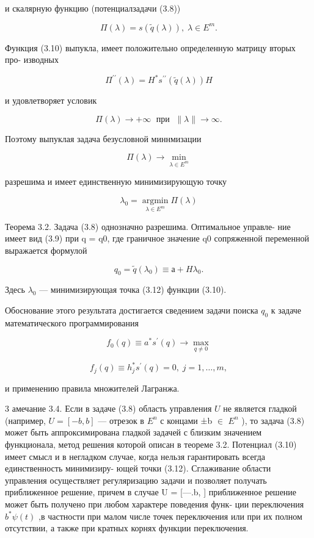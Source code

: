 \documentclass[10pt]{article}
\begin{document}
и скалярную функцию (потенциалзадачи (3.8))

\[
\Pi \left( \lambda \right)  = s\left( {\widetilde{q}\left( \lambda \right) }\right) ,\;\lambda  \in  {E}^{m}. \tag{3.10}
\]

Функция (3.10) выпукла, имеет положительно определенную матрицу вторых про- изводных

\[
{\Pi }^{\prime \prime }\left( \lambda \right)  = {H}^{ * }{s}^{\prime \prime }\left( {\widetilde{q}\left( \lambda \right) }\right) H
\]

и удовлетворяет условик

\[
\Pi \left( \lambda \right)  \rightarrow   + \infty \;\text{ при }\;\parallel \lambda \parallel  \rightarrow  \infty .
\]

Поэтому выпуклая задача безусловной миннмизации

\[
\Pi \left( \lambda \right)  \rightarrow  \mathop{\min }\limits_{{\lambda  \in  {E}^{m}}} \tag{3.11}
\]

разрешима и имеет единственную минимизирующую точку

\[
{\lambda }_{0} = \mathop{\operatorname{argmin}}\limits_{{\lambda  \in  {E}^{m}}}\Pi \left( \lambda \right) \tag{3.12}
\]

Теорема 3.2. Задача (3.8) однозначно разрешима. Оптимальное управле- ние имеет вид (3.9) при q = q0, где граничное значение q0 сопряженной переменной выражается формулой

\[
{q}_{0} = \widetilde{q}\left( {\lambda }_{0}\right)  \equiv  а + H{\lambda }_{0}. \tag{3.13}
\]

Здесь \({\lambda }_{0}\) — минимизирующая точка (3.12) функции (3.10).

Обоснование этого результата достигается сведением задачи поиска \({q}_{0}\) к задаче математического программирования

\[
{f}_{0}\left( q\right)  \equiv  {a}^{ * }{s}^{\prime }\left( q\right)  \rightarrow  \mathop{\max }\limits_{{q \neq  0}}
\]

\[
{f}_{j}\left( q\right)  \equiv  {h}_{j}^{ * }{s}^{\prime }\left( q\right)  = 0,\;j = 1,\ldots ,m,
\]

и применению правила множителей Лагранжа.

3 амечание 3.4. Если в задаче (3.8) область управления \(U\) не является гладкой (например, \(U = \left[  {-b,b}\right]\) — отрезок в \({E}^{n}\) с концами ±b \(\in\) \({E}^{n}\) ), то задача (3.8) может быть аппроксимирована гладкой задачей с близким значением функционала, метод решения которой описан в теореме 3.2. Потенциал (3.10) имеет смысл и в негладком случае, когда нельзя гарантировать всегда единственность минимизиру- ющей точки (3.12). Сглаживание области управления осуществляет регуляризацию задачи и позволяет получать приближенное решение, причем в случае U = [—.b, ] приближенное решение может быть получено при любом характере поведения функ- ции переключения \({b}^{ * }\psi \left( t\right)\) ,в частности при малом числе точек переключения или при их полном отсутствии, а также при кратных корнях функции переключения.
\end{document}
